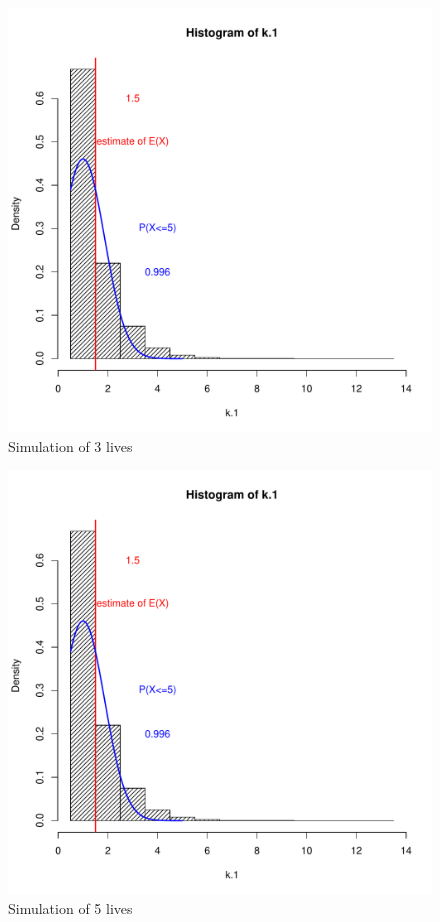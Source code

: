\documentclass[a4paper, 11pt]{article}
\begin{document}
\begin{figure}[H]
  \centering
  \includegraphics[scale=0.7,page=2]{Rplots.pdf}
  \caption{Simulation of 3 lives}
  \label{k3}
\end{figure}

\begin{figure}[H]
  \centering
  \includegraphics[scale=0.7,page=3]{Rplots.pdf}
  \caption{Simulation of 5 lives}
  \label{k5}
\end{figure}
\end{document}
